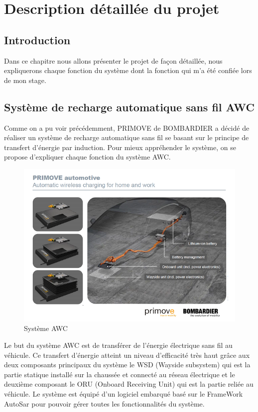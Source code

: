 \chapter{Description détaillée du projet}
\section*{Introduction}
Dans ce chapitre nous allons présenter le projet de façon détaillée, nous expliquerons chaque fonction du système dont la fonction qui m'a été confiée lors de mon stage.

\section{Système de recharge automatique sans fil AWC}
Comme on a pu voir précédemment, PRIMOVE de BOMBARDIER a décidé de réaliser un système de recharge automatique sans fil se basant sur le principe de transfert d’énergie par induction. Pour mieux appréhender le système, on se propose d’expliquer chaque fonction du système AWC.

\begin{figure}[H]
 \centering
 \includegraphics[scale=1]{images/look_through_awc}
 \caption{Système AWC}
\end{figure}

Le but du système AWC est de transférer de l’énergie électrique sans fil au véhicule. Ce transfert d’énergie atteint un niveau d’efficacité très haut grâce aux deux composants principaux du système le WSD (Wayside subsystem) qui est la partie statique installé sur la chaussée et connecté au réseau électrique et le deuxième composant le ORU (Onboard Receiving Unit) qui est la partie reliée au véhicule. Le système est équipé d’un logiciel embarqué basé sur le FrameWork AutoSar pour pouvoir gérer toutes les fonctionnalités du système.

